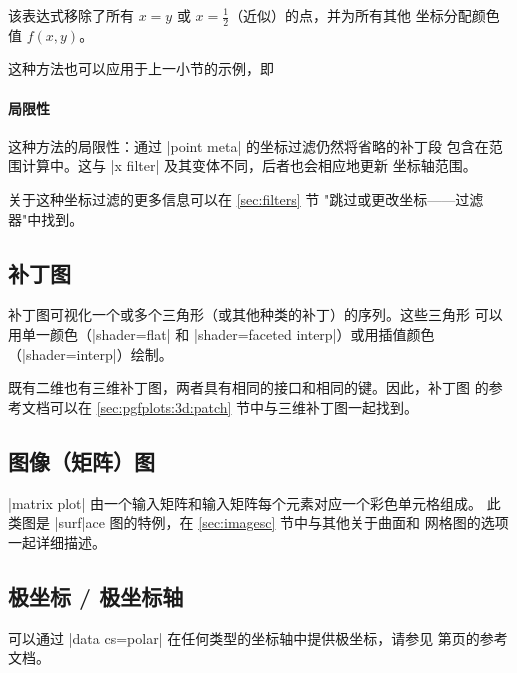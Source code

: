 {该表达式移除了所有 $x=y$ 或 $x=\frac12$（近似）的点，并为所有其他
坐标分配颜色值 $f(x,y)$。

这种方法也可以应用于上一小节的示例，即
%
\begin{codeexample}[]
\end{codeexample}


\paragraph{局限性}

这种方法的局限性：通过 |point meta| 的坐标过滤仍然将省略的补丁段
包含在范围计算中。这与 |x filter| 及其变体不同，后者也会相应地更新
坐标轴范围。

关于这种坐标过滤的更多信息可以在 \ref{sec:filters} 节
"跳过或更改坐标——过滤器"中找到。


\subsection{补丁图}
\label{sec:pgfplots:2d:patch}

补丁图可视化一个或多个三角形（或其他种类的补丁）的序列。这些三角形
可以用单一颜色（|shader=flat| 和 |shader=faceted interp|）或用插值颜色
（|shader=interp|）绘制。

既有二维也有三维补丁图，两者具有相同的接口和相同的键。因此，补丁图
的参考文档可以在 \ref{sec:pgfplots:3d:patch} 节中与三维补丁图一起找到。


\subsection{图像（矩阵）图}

|matrix plot| 由一个输入矩阵和输入矩阵每个元素对应一个彩色单元格组成。
此类图是 |surf|ace 图的特例，在 \ref{sec:imagesc} 节中与其他关于曲面和
网格图的选项一起详细描述。


\subsection{极坐标 / 极坐标轴}

可以通过 |data cs=polar| 在任何类型的坐标轴中提供极坐标，请参见
第\pageref{key:data:cs}页的参考文档。

}

